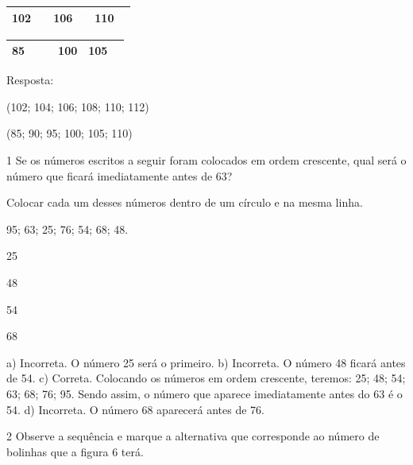 \begin{escolha}
\begin{escolha}

\item
\end{escolha}

\begin{longtable}[]{@{}llllll@{}}
\toprule
102 & & 106 & & 110 &\tabularnewline
\bottomrule
\end{longtable}

\begin{escolha}

\item
\end{escolha}

\begin{longtable}[]{@{}llllll@{}}
\toprule
85 & & & 100 & 105 &\tabularnewline
\bottomrule
\end{longtable}

Resposta:

\begin{escolha}

\item
  (102; 104; 106; 108; 110; 112)
\item
  (85; 90; 95; 100; 105; 110)
\end{escolha}


\num{1} Se os números escritos a seguir foram colocados em ordem crescente, qual
será o número que ficará imediatamente antes de 63?

Colocar cada um desses números dentro de um círculo e na mesma linha.

95; 63; 25; 76; 54; 68; 48.

\begin{escolha}

\item
  25
\item
  48
\item
  54
\item
  68
\end{escolha}

a) Incorreta. O número 25 será o primeiro.
b) Incorreta. O número 48 ficará antes de 54.
c) Correta. Colocando os números em ordem crescente, teremos: 25; 48; 54; 63; 68; 76; 95. Sendo assim, o número que aparece imediatamente antes do 63 é o 54.
d) Incorreta. O número 68 aparecerá antes de 76.

\num{2} Observe a sequência e marque a alternativa que corresponde ao número de bolinhas que a figura 6 terá.


\end{escolha}
